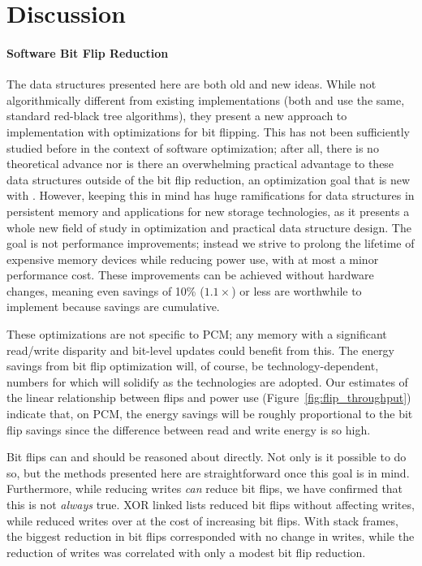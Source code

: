 \section{Discussion}
\label{sec:disc}

\paragraph{Software Bit Flip Reduction}

The data structures presented here are both old and new ideas. While not
algorithmically different from existing implementations (both \xrbt and \rbt use
the same, standard red-black tree algorithms), they present a new approach to
implementation with optimizations for bit flipping. This
has not been sufficiently studied before in the context of software optimization;
after all, there is no theoretical advance nor is there an overwhelming
practical advantage to these data structures outside of the bit flip reduction,
an optimization goal that is new with \NVM. However, keeping this in mind has
huge ramifications for data structures in persistent memory and applications for
new storage technologies, as it presents a whole new field of
study in optimization and practical data structure design. The goal is
not performance improvements; instead we strive to prolong the lifetime of expensive
memory devices while reducing power use, with at most a minor
performance cost. These improvements can be achieved without hardware
changes, meaning even savings of 10\% ($1.1\times$) or
less are worthwhile to implement because savings are cumulative.

These optimizations are not specific to PCM; any memory with a significant read/write
disparity and bit-level updates could benefit from this. The energy savings from bit flip
optimization will, of course, be technology-dependent, numbers for which will solidify as the
technologies are adopted. Our estimates of the linear relationship
between flips and power use (Figure~\ref{fig:flip_throughput}) indicate that, on PCM, the energy
savings will be roughly proportional to the bit flip savings since the difference between read and
write energy is so high.

Bit flips can and should be reasoned about directly. Not only is it possible to
do so, but the methods presented here are straightforward once this goal is in mind.
Furthermore, while reducing writes \textit{can} reduce bit flips, we have
confirmed that this is not \textit{always} true. XOR linked lists reduced bit
flips without affecting writes, while \xrbt reduced writes over \xrbtbig
at the cost of increasing bit flips. With stack frames, the biggest reduction in bit flips
corresponded with no change in writes, while the reduction of writes was
correlated with only a modest bit flip reduction.

